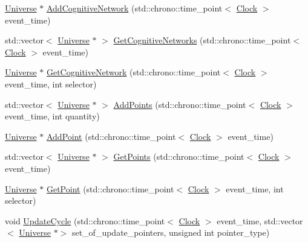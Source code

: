\begin{DoxyCompactItemize}
\item 
\mbox{\hyperlink{classUniverse}{Universe}} $\ast$ \mbox{\hyperlink{classUniverse_ab682307c963836cd81b35b5604bd7064}{Add\+Cognitive\+Network}} (std\+::chrono\+::time\+\_\+point$<$ \mbox{\hyperlink{universe_8h_a0ef8d951d1ca5ab3cfaf7ab4c7a6fd80}{Clock}} $>$ event\+\_\+time)
\item 
std\+::vector$<$ \mbox{\hyperlink{classUniverse}{Universe}} $\ast$ $>$ \mbox{\hyperlink{classUniverse_a06968a24194280a43f077c5b77379ea8}{Get\+Cognitive\+Networks}} (std\+::chrono\+::time\+\_\+point$<$ \mbox{\hyperlink{universe_8h_a0ef8d951d1ca5ab3cfaf7ab4c7a6fd80}{Clock}} $>$ event\+\_\+time)
\item 
\mbox{\hyperlink{classUniverse}{Universe}} $\ast$ \mbox{\hyperlink{classUniverse_a1ea2b7e438bfdc7dd599aa59c310b126}{Get\+Cognitive\+Network}} (std\+::chrono\+::time\+\_\+point$<$ \mbox{\hyperlink{universe_8h_a0ef8d951d1ca5ab3cfaf7ab4c7a6fd80}{Clock}} $>$ event\+\_\+time, int selector)
\item 
std\+::vector$<$ \mbox{\hyperlink{classUniverse}{Universe}} $\ast$ $>$ \mbox{\hyperlink{classUniverse_aa48ced2078ba863723050d8283b3fa67}{Add\+Points}} (std\+::chrono\+::time\+\_\+point$<$ \mbox{\hyperlink{universe_8h_a0ef8d951d1ca5ab3cfaf7ab4c7a6fd80}{Clock}} $>$ event\+\_\+time, int quantity)
\item 
\mbox{\hyperlink{classUniverse}{Universe}} $\ast$ \mbox{\hyperlink{classUniverse_a8508b791c6997d8abcdcc037a6776734}{Add\+Point}} (std\+::chrono\+::time\+\_\+point$<$ \mbox{\hyperlink{universe_8h_a0ef8d951d1ca5ab3cfaf7ab4c7a6fd80}{Clock}} $>$ event\+\_\+time)
\item 
std\+::vector$<$ \mbox{\hyperlink{classUniverse}{Universe}} $\ast$ $>$ \mbox{\hyperlink{classUniverse_a765c6c658b7a465cd92418690db846ae}{Get\+Points}} (std\+::chrono\+::time\+\_\+point$<$ \mbox{\hyperlink{universe_8h_a0ef8d951d1ca5ab3cfaf7ab4c7a6fd80}{Clock}} $>$ event\+\_\+time)
\item 
\mbox{\hyperlink{classUniverse}{Universe}} $\ast$ \mbox{\hyperlink{classUniverse_a3774f14a13a55827a1a4eea0a404edcb}{Get\+Point}} (std\+::chrono\+::time\+\_\+point$<$ \mbox{\hyperlink{universe_8h_a0ef8d951d1ca5ab3cfaf7ab4c7a6fd80}{Clock}} $>$ event\+\_\+time, int selector)
\item 
void \mbox{\hyperlink{classUniverse_a0d79e614e1af951c06b78cb5768f9c8e}{Update\+Cycle}} (std\+::chrono\+::time\+\_\+point$<$ \mbox{\hyperlink{universe_8h_a0ef8d951d1ca5ab3cfaf7ab4c7a6fd80}{Clock}} $>$ event\+\_\+time, std\+::vector$<$ \mbox{\hyperlink{classUniverse}{Universe}} $\ast$$>$ set\+\_\+of\+\_\+update\+\_\+pointers, unsigned int pointer\+\_\+type)
$$
\end{DoxyCompactItemize}
